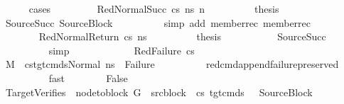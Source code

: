 \begin{isabellebody}
\ \ \ \ \isamarkupfalse%
\ cases\ \isanewline
\ \ \ \ \ \ \isamarkupfalse%
\ {\isacharparenleft}{\kern0pt}RedNormalSucc\ cs\ ns{\isacharprime}{\kern0pt}\ n{\isacharprime}{\kern0pt}{\isacharparenright}{\kern0pt}\isanewline
\ \ \ \ \ \ \isamarkupfalse%
\ \isamarkupfalse%
\ {\isacharquery}{\kern0pt}thesis\ \isanewline
\ \ \ \ \ \ \ \ \isamarkupfalse%
\ SourceSucc\ SourceBlock\isanewline
\ \ \ \ \ \ \ \ \isamarkupfalse%
\ {\isacharparenleft}{\kern0pt}simp\ add{\isacharcolon}{\kern0pt}\ member{\isacharunderscore}{\kern0pt}rec{\isacharparenleft}{\kern0pt}{}{\isacharparenright}{\kern0pt}\ member{\isacharunderscore}{\kern0pt}rec{\isacharparenleft}{\kern0pt}{}{\isacharparenright}{\kern0pt}{\isacharparenright}{\kern0pt}\isanewline
\ \ \ \ \isamarkupfalse%
\isanewline
\ \ \ \ \ \ \isamarkupfalse%
\ {\isacharparenleft}{\kern0pt}RedNormalReturn\ cs\ ns{\isacharprime}{\kern0pt}{\isacharparenright}{\kern0pt}\isanewline
\ \ \ \ \ \ \isamarkupfalse%
\ \isamarkupfalse%
\ {\isacharquery}{\kern0pt}thesis\ \isanewline
\ \ \ \ \ \ \ \ \isamarkupfalse%
\ SourceSucc\isanewline
\ \ \ \ \ \ \ \ \isamarkupfalse%
\ simp\isanewline
\ \ \ \ \isamarkupfalse%
\isanewline
\ \ \ \ \ \ \isamarkupfalse%
\ {\isacharparenleft}{\kern0pt}RedFailure\ cs{\isacharparenright}{\kern0pt}\isanewline
\ \ \ \ \ \ \isamarkupfalse%
\ {\isachardoublequoteopen}M{\isacharcomma}{\kern0pt}{\isasymLambda}{\isacharcomma}{\kern0pt}{\isasymGamma}{\isacharcomma}{\kern0pt}{\isasymOmega}\ {\isasymturnstile}\ {\isasymlangle}cs{\isacharat}{\kern0pt}tgt{\isacharunderscore}{\kern0pt}cmds{\isacharunderscore}{\kern0pt}{}{\isacharcomma}{\kern0pt}Normal\ ns{\isasymrangle}\ {\isacharbrackleft}{\kern0pt}{\isasymrightarrow}{\isacharbrackright}{\kern0pt}\ Failure{\isachardoublequoteclose}\isanewline
\ \ \ \ \ \ \ \ \isamarkupfalse%
\ red{\isacharunderscore}{\kern0pt}cmd{\isacharunderscore}{\kern0pt}append{\isacharunderscore}{\kern0pt}failure{\isacharunderscore}{\kern0pt}preserved\isanewline
\ \ \ \ \ \ \ \ \isamarkupfalse%
\ fast\isanewline
\ \ \ \ \ \ \isamarkupfalse%
\ False\ \isanewline
\ \ \ \ \ \ \ \ \isamarkupfalse%
\ TargetVerifies\ {\isacartoucheopen}\ node{\isacharunderscore}{\kern0pt}to{\isacharunderscore}{\kern0pt}block\ G\ {\isacharbang}{\kern0pt}\ src{\isacharunderscore}{\kern0pt}block{\isacharunderscore}{\kern0pt}{}\ {\isacharequal}{\kern0pt}\ cs{\isacartoucheclose}\ {\isacartoucheopen}tgt{\isacharunderscore}{\kern0pt}cmds{\isacharunderscore}{\kern0pt}{}\ {\isacharequal}{\kern0pt}\ {\isacharunderscore}{\kern0pt}{\isacartoucheclose}\ SourceBlock\isanewline

\end{isabellebody}
